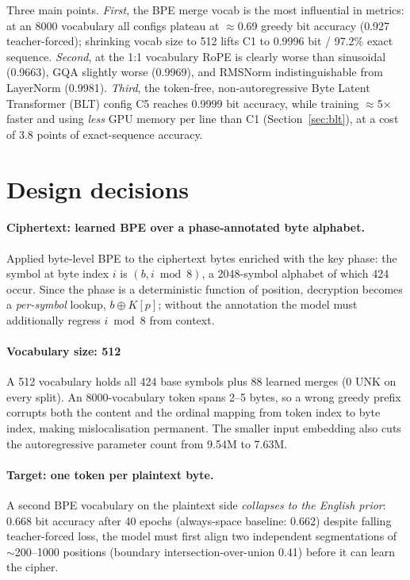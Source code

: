 \documentclass[12pt]{article}
\begin{document}
Three main points. \emph{First}, the BPE merge vocab is the most influential in metrics:
at an 8000 vocabulary all configs plateau at $\approx$0.69 greedy
bit accuracy (0.927 teacher-forced); shrinking vocab size to 512 lifts C1 to 0.9996
bit / 97.2\% exact sequence. \emph{Second}, at the 1:1
vocabulary RoPE is clearly worse than sinusoidal (0.9663), GQA slightly worse
(0.9969), and RMSNorm indistinguishable from LayerNorm (0.9981). \emph{Third}, the
token-free, non-autoregressive Byte Latent Transformer (BLT) config C5 reaches
0.9999 bit accuracy, while training $\approx$5$\times$
faster and using \emph{less} GPU memory per line than C1
(Section~\ref{sec:blt}), at a cost of 3.8 points of exact-sequence accuracy.

\section{Design decisions}
\label{sec:design}
\paragraph{Ciphertext: learned BPE over a phase-annotated byte alphabet.}
Applied byte-level BPE to the ciphertext bytes enriched with the key phase: the
symbol at byte index $i$ is $(b, i \bmod 8)$, a 2048-symbol alphabet of which 424
occur. Since the phase is a deterministic function of position, decryption
becomes a \emph{per-symbol} lookup, $b \oplus K[p]$; without the annotation the
model must additionally regress $i \bmod 8$ from context.

\paragraph{Vocabulary size: 512}
A 512 vocabulary holds all 424 base symbols plus 88 learned merges (0 UNK on
every split). An 8000-vocabulary token spans 2--5 bytes, so a wrong greedy prefix
corrupts both the content and the ordinal mapping from token index to byte index,
making mislocalisation permanent. The smaller input
embedding also cuts the autoregressive parameter count from 9.54M to 7.63M.

\paragraph{Target: one token per plaintext byte.}
A second BPE vocabulary on the plaintext side \emph{collapses to the English
prior}: 0.668 bit accuracy after 40 epochs (always-space baseline: 0.662) despite
falling teacher-forced loss, the model must first align two independent
segmentations of $\sim$200--1000 positions (boundary intersection-over-union 0.41)
before it can learn the cipher.
\end{document}
